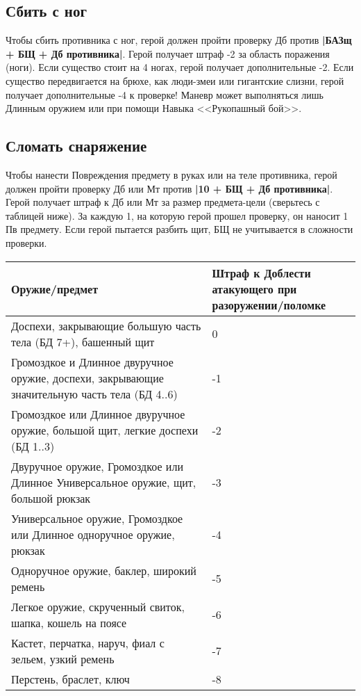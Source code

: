 \subsection{Сбить с ног}
Чтобы сбить противника с ног, герой должен пройти проверку Дб против \textbf{|БАЗщ + БЩ + Дб противника|}.
\newline
Герой получает штраф -2 за область поражения (ноги). Если существо стоит на 4 ногах, герой получает дополнительные -2. Если существо передвигается на брюхе, как люди-змеи или гигантские слизни, герой получает дополнительные -4 к проверке! Маневр может выполняться лишь Длинным оружием или при помощи Навыка <<Рукопашный бой>>.
\subsection{Сломать снаряжение}
Чтобы нанести Повреждения предмету в руках или на теле противника, герой должен пройти проверку Дб или Мт против \textbf{|10 + БЩ + Дб противника|}.
\newline
Герой получает штраф к Дб или Мт за размер предмета-цели (сверьтесь с таблицей ниже). За каждую 1, на которую герой прошел проверку, он наносит 1 Пв предмету. Если герой пытается разбить щит, БЩ не учитывается в сложности проверки. 
\begin{center}
\begin{tabular}{|p{10cm}|p{4cm}|}
\hline
Оружие/предмет & Штраф к Доблести атакующего при разоружении/поломке \\ \hline
Доспехи, закрывающие большую часть тела (БД 7+), башенный щит & 0 \\ \hline
Громоздкое и Длинное двуручное оружие, доспехи, закрывающие значительную часть тела (БД 4..6) & -1 \\ \hline
Громоздкое или Длинное двуручное оружие, большой щит, легкие доспехи (БД 1..3) & -2 \\ \hline
Двуручное оружие, Громоздкое или Длинное Универсальное оружие, щит, большой рюкзак & -3 \\ \hline
Универсальное оружие, Громоздкое или Длинное одноручное оружие, рюкзак & -4 \\ \hline
Одноручное оружие, баклер, широкий ремень & -5 \\ \hline
Легкое оружие, скрученный свиток, шапка, кошель на поясе & -6 \\ \hline
Кастет, перчатка, наруч, фиал с зельем, узкий ремень & -7 \\ \hline
Перстень, браслет, ключ & -8 \\ \hline
\end{tabular}
\end{center}

